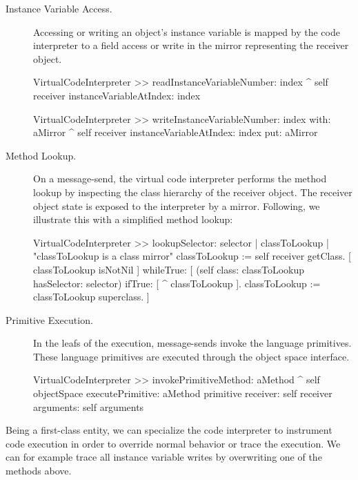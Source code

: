 \begin{description}
\item[Instance Variable Access.] Accessing or writing an object's instance variable is mapped by the code interpreter to a field access or write in the mirror representing the receiver object.

\begin{code}
VirtualCodeInterpreter >> readInstanceVariableNumber: index
    ^ self receiver instanceVariableAtIndex: index
    
VirtualCodeInterpreter >> writeInstanceVariableNumber: index with: aMirror
    ^ self receiver instanceVariableAtIndex: index put: aMirror
\end{code}

\item[Method Lookup.] On a message-send, the virtual code interpreter performs the method lookup by inspecting the class hierarchy of the receiver object. The receiver object state is exposed to the interpreter by a mirror. Following, we illustrate this with a simplified method lookup:

\begin{code}
VirtualCodeInterpreter >> lookupSelector: selector
    | classToLookup |
    "classToLookup is a class mirror"
    classToLookup := self receiver getClass.
    [ classToLookup isNotNil ] whileTrue: [
        (self class: classToLookup hasSelector: selector)
        	    ifTrue: [ ^ classToLookup ].
	classToLookup := classToLookup superclass.
    ]
\end{code}

\item[Primitive Execution.] In the leafs of the execution, message-sends invoke the language primitives. These language primitives are executed through the object space interface.

\begin{code}
VirtualCodeInterpreter >> invokePrimitiveMethod: aMethod
    ^ self objectSpace
         executePrimitive: aMethod primitive
         receiver: self receiver
         arguments: self arguments
\end{code}

\end{description}

Being a first-class entity, we can specialize the code interpreter to instrument code execution in order to override normal behavior or trace the execution. We can for example trace all instance variable writes by overwriting one of the methods above.

